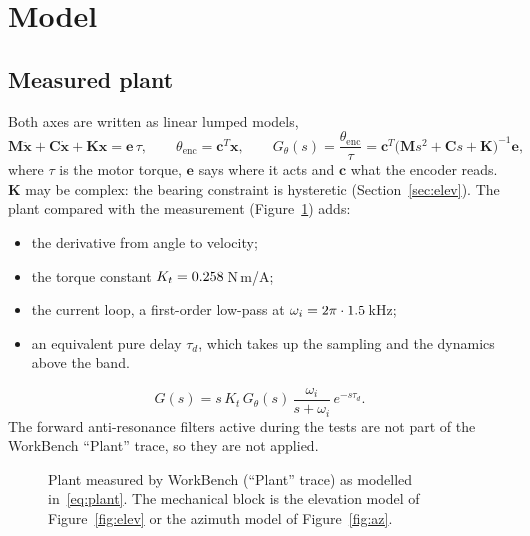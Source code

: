 \documentclass[10pt,a4paper]{article}
\numberwithin{equation}{section}
\begin{document}
\section{Model}\label{sec:model}
\subsection{Measured plant}
Both axes are written as linear lumped models,
\begin{equation}
\mathbf M\ddot{\mathbf x}+\mathbf C\dot{\mathbf x}+\mathbf K\mathbf x=\mathbf e\,\tau,\qquad \theta_\mathrm{enc}=\mathbf c^T\mathbf x,\qquad
G_\theta(s)=\frac{\theta_\mathrm{enc}}{\tau}=\mathbf c^T\bigl(\mathbf Ms^2+\mathbf Cs+\mathbf K\bigr)^{-1}\mathbf e ,\label{eq:lumped}
\end{equation}
where $\tau$ is the motor torque, $\mathbf e$ says where it acts and $\mathbf c$ what the encoder reads. $\mathbf K$ may be complex: the bearing constraint is hysteretic (Section~\ref{sec:elev}). The plant compared with the measurement (Figure~\ref{fig:plant}) adds:
\begin{itemize}
\item the derivative from angle to velocity;
\item the torque constant $K_t=0.258$\,N\,m/A;
\item the current loop, a first-order low-pass at $\omega_i=2\pi\cdot1.5$\,kHz;
\item an equivalent pure delay $\tau_d$, which takes up the sampling and the dynamics above the band.
\end{itemize}
\begin{equation}
G(s)=s\,K_t\,G_\theta(s)\,\frac{\omega_i}{s+\omega_i}\,e^{-s\tau_d} .\label{eq:plant}
\end{equation}
The forward anti-resonance filters active during the tests are not part of the WorkBench ``Plant'' trace, so they are not applied.

\begin{figure}[H]\centering
{}
\caption{Plant measured by WorkBench (``Plant'' trace) as modelled in~\eqref{eq:plant}. The mechanical block is the elevation model of Figure~\ref{fig:elev} or the azimuth model of Figure~\ref{fig:az}.}\label{fig:plant}
\end{figure}
\end{document}
